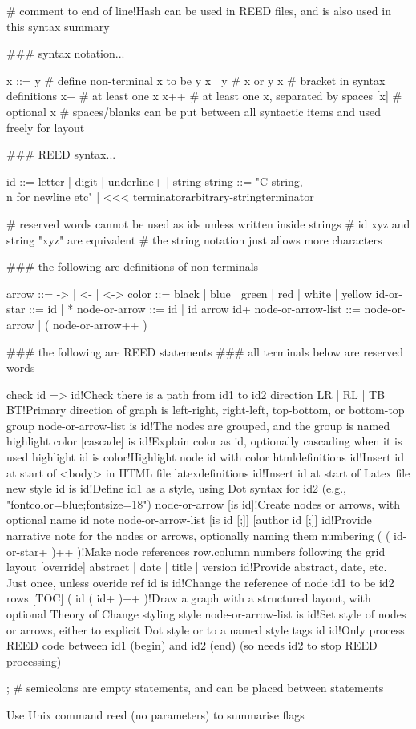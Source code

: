 # comment to end of line!Hash can be used in REED files, and is also used in this syntax summary

### syntax notation...

x ::= y # define non-terminal x to be y
x | y   # x or y
{x}     # bracket in syntax definitions
x+      # at least one x
x++     # at least one x, separated by spaces
[x]     # optional x
        # spaces/blanks can be put between all syntactic items and used freely for layout 

### REED syntax...

id ::= {letter | digit | underline}+ | string
string ::= "C string, \\n for newline etc" | <<< terminator\n                                                        arbitrary-string\n                                                terminator

# reserved words cannot be used as ids unless written inside strings
# id xyz and string "xyz" are equivalent
# the string notation just allows more characters

### the following are definitions of non-terminals

arrow ::= -> | <- | <->
color ::= black | blue | green | red | white | yellow
id-or-star ::= id | *
node-or-arrow ::= id | id {arrow id}+
node-or-arrow-list ::= node-or-arrow | ( node-or-arrow++ )

### the following are REED statements
### all terminals below are reserved words

check id => id!Check there is a path from id1 to id2
direction {LR | RL | TB | BT}!Primary direction of graph is left-right, right-left, top-bottom, or bottom-top
group node-or-arrow-list is id!The nodes are grouped, and the group is named
highlight color [cascade] is id!Explain color as id, optionally cascading when it is used
highlight id is color!Highlight node id with color
htmldefinitions id!Insert id at start of <body> in HTML file
latexdefinitions id!Insert id at start of Latex file
new style id is id!Define id1 as a style, using Dot syntax for id2 (e.g., "fontcolor=blue;fontsize=18")
node-or-arrow [is id]!Create nodes or arrows, with optional name id
note node-or-arrow-list [is id [;]] [author id [;]] id!Provide narrative note for the nodes or arrows, optionally naming them
numbering ( {( id-or-star+ )}++ )!Make node references row.column numbers following the grid layout
[override] {abstract | date | title | version} id!Provide abstract, date, etc. Just once, unless overide
ref id is id!Change the reference of node id1 to be id2
rows [TOC] ( {id ( id+ )}++ )!Draw a graph with a structured layout, with optional Theory of Change styling
style node-or-arrow-list is id!Set style of nodes or arrows, either to explicit Dot style or to a named style
tags id id!Only process REED code between id1 (begin) and id2 (end) (so needs id2 to stop REED processing)

; # semicolons are empty statements, and can be placed between statements

Use Unix command reed (no parameters) to summarise flags











